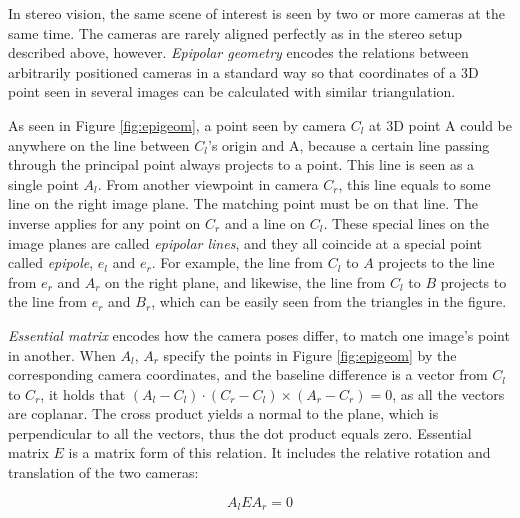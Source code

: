 
In stereo vision, the same scene of interest is seen by two or more cameras at the same time.
The cameras are rarely aligned perfectly as in the stereo setup described above, however.
\emph{Epipolar geometry} encodes the relations between arbitrarily positioned cameras in a standard way so that coordinates of a 3D point seen in several images can be calculated with similar triangulation.
\cite{hartley03multiview}

As seen in Figure \ref{fig:epigeom}, a point seen by camera $C_l$ at 3D point A could be anywhere on the line between $C_l$'s origin and A, because a certain line passing through the principal point always projects to a point.
This line is seen as a single point $A_l$.
From another viewpoint in camera $C_r$, this line equals to some line on the right image plane.
The matching point must be on that line.
The inverse applies for any point on $C_r$ and a line on $C_l$.
These special lines on the image planes are called \emph{epipolar lines}, and they all coincide at a special point called \emph{epipole}, $e_l$ and $e_r$.
For example, the line from $C_l$ to $A$ projects to the line from $e_r$ and $A_r$ on the right plane, and likewise, the line from $C_l$ to $B$ projects to the line from $e_r$ and $B_r$, which can be easily seen from the triangles in the figure.

\emph{Essential matrix} \cite{hartley03multiview} encodes how the camera poses differ, to match one image's point in another.
When $A_l$, $A_r$ specify the points in Figure \ref{fig:epigeom} by the corresponding camera coordinates, and the baseline difference is a vector from $C_l$ to $C_r$, it holds that $(A_l-C_l) \cdot (C_r - C_l) \times (A_r-C_r) = 0$, as all the vectors are coplanar.
The cross product yields a normal to the plane, which is perpendicular to all the vectors, thus the dot product equals zero.
Essential matrix $E$ is a matrix form of this relation.
It includes the relative rotation and translation of the two cameras:

\begin{equation} \label{eq:essential}
	A_l E A_r = 0
\end{equation}


